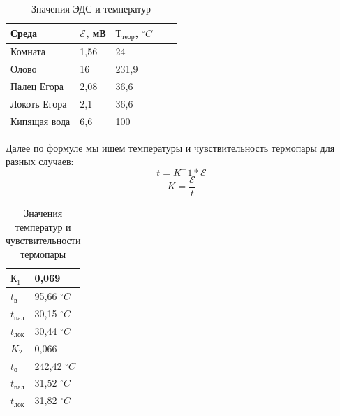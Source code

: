 \documentclass[a4paper,12pt]{article}
\begin{document}
\begin{table}[!ht]
    \centering
    \begin{tabular}{|l|l|l|l|l|}
    \hline
        Среда           & $\mathcal{E}$, мВ & $Т_{теор}$, $^{\circ} C$\\ \hline
        Комната         & 1,56   & 24\\ \hline
        Олово           & 16     & 231,9 \\ \hline
        Палец Егора     & 2,08   & 36,6 \\ \hline
        Локоть Егора    & 2,1    & 36,6 \\ \hline
        Кипящая вода    & 6,6    & 100 \\ \hline
    \end{tabular}
    \caption{Значения ЭДС и температур}
\end{table}

Далее по формуле мы ищем температуры и чувствительность термопары для разных случаев:
\begin{equation}
    t = K^-1 * \mathcal{E}
\end{equation}
\begin{equation}
    K = \frac{\mathcal{E}}{t}
\end{equation}

\begin{table}[!ht]
    \centering
    \begin{tabular}{|l|l|}
    \hline
        $К_1$       & 0,069  \\ \hline
        $t_в$       & 95,66  $^{\circ} C$\\ \hline
        $t_{пал}$   & 30,15  $^{\circ} C$\\ \hline
        $t_{лок}$   & 30,44  $^{\circ} C$\\ \hline
        $K_2$       & 0,066  \\ \hline
        $t_о$       & 242,42 $^{\circ} C$\\ \hline
        $t_{пал}$   & 31,52  $^{\circ} C$\\ \hline
        $t_{лок}$   & 31,82  $^{\circ} C$\\ \hline
    \end{tabular}
    \caption{Значения температур и чувствительности термопары}
\end{table}
\end{document}
